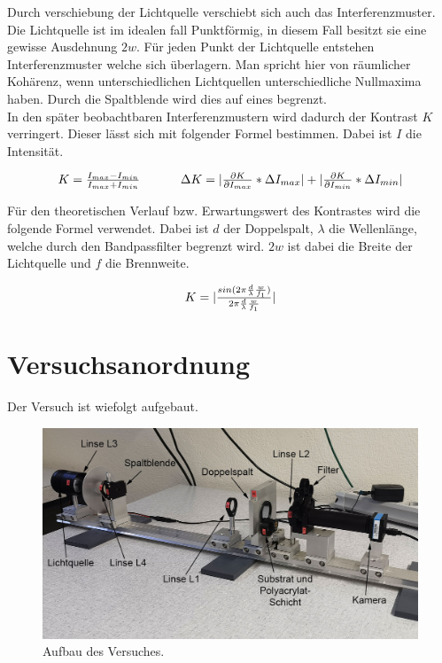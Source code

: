 \documentclass[12pt,a4paper,twoside]{article}
\begin{document}
\noindent
Durch verschiebung der Lichtquelle verschiebt sich auch das Interferenzmuster. Die Lichtquelle ist im idealen fall Punktförmig, in diesem Fall besitzt sie eine gewisse Ausdehnung $2w$. 
Für jeden Punkt der Lichtquelle entstehen Interferenzmuster welche sich überlagern. Man spricht hier von räumlicher Kohärenz, wenn unterschiedlichen Lichtquellen unterschiedliche Nullmaxima haben. 
Durch die Spaltblende wird dies auf eines begrenzt. \\
In den später beobachtbaren Interferenzmustern wird dadurch der Kontrast $K$ verringert. Dieser lässt sich mit folgender Formel bestimmen. Dabei ist $I$ die Intensität. 

\begin{equation}
    \label{eq:Kontrast}
    \centerline{$K = \frac{I_{max} - I_{min}}{I_{max} + I_{min}} $ \\ $\Delta K = \vert \frac{\partial K}{\partial I_{max}} * \Delta I_{max} \vert + \vert \frac{\partial K}{\partial I_{min}} * \Delta I_{min} \vert$} %
\end{equation}

\noindent
Für den theoretischen Verlauf bzw. Erwartungswert des Kontrastes wird die folgende Formel verwendet. Dabei ist $d$ der Doppelspalt, $\lambda$ die Wellenlänge, welche durch den Bandpassfilter begrenzt wird. $2w$ ist dabei die Breite der Lichtquelle und $f$ die Brennweite. 

\begin{equation}
    \label{eq:Kontrasttheorie}
    \centerline{$K = \vert \frac{sin(2 \pi \frac{d}{\lambda} \frac{w}{f_1})}{2 \pi \frac{d}{\lambda} \frac{w}{f_1}} \vert$}
\end{equation}


\section{Versuchsanordnung} %
Der Versuch ist wiefolgt aufgebaut. 

\begin{figure}[H]
    \centering
    \includegraphics[width=0.6\linewidth]{nudes/aufbau.jpg}
    \caption{Aufbau des Versuches.}
    \label{fig:aufbau}
\end{figure}
\end{document}
